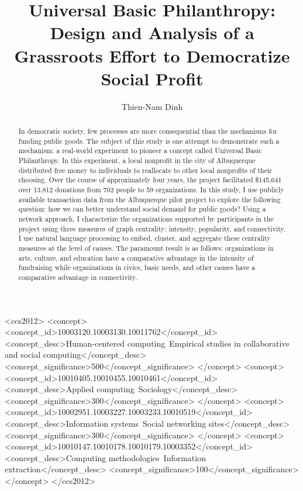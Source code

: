 \documentclass[sigconf]{acmart}
\begin{document}
\title{Universal Basic Philanthropy: Design and Analysis of a Grassroots Effort to Democratize Social Profit}

\author{Thien-Nam Dinh}

\begin{abstract}
  In democratic society, few processes are more consequential than the mechanisms for funding public goods.
  The subject of this study is one attempt to demonstrate such a mechanism: a real-world experiment to pioneer a concept called Universal Basic Philanthropy.
  In this experiment, a local nonprofit in the city of Albuquerque distributed free money to individuals to reallocate to other local nonprofits of their choosing.
  Over the course of approximately four years, the project facilitated \$145,641 over 13,812 donations from 702 people to 59 organizations.
  In this study, I use publicly available transaction data from the Albuquerque pilot project to explore the following question: how we can better understand social demand for public goods?
  Using a network approach, I characterize the organizations supported by participants in the project using three measures of graph centrality: intensity, popularity, and connectivity.
  I use natural language processing to embed, cluster, and aggregate these centrality measures at the level of causes.
  The paramount result is as follows: organizations in arts, culture, and education have a comparative advantage in the intensity of fundraising while organizations in civics, basic needs, and other causes have a comparative advantage in connectivity.
\end{abstract}

\begin{CCSXML}
<ccs2012>
   <concept>
       <concept_id>10003120.10003130.10011762</concept_id>
       <concept_desc>Human-centered computing~Empirical studies in collaborative and social computing</concept_desc>
       <concept_significance>500</concept_significance>
       </concept>
   <concept>
       <concept_id>10010405.10010455.10010461</concept_id>
       <concept_desc>Applied computing~Sociology</concept_desc>
       <concept_significance>300</concept_significance>
       </concept>
   <concept>
       <concept_id>10002951.10003227.10003233.10010519</concept_id>
       <concept_desc>Information systems~Social networking sites</concept_desc>
       <concept_significance>300</concept_significance>
       </concept>
   <concept>
       <concept_id>10010147.10010178.10010179.10003352</concept_id>
       <concept_desc>Computing methodologies~Information extraction</concept_desc>
       <concept_significance>100</concept_significance>
       </concept>
 </ccs2012>
\end{CCSXML}
\end{document}
